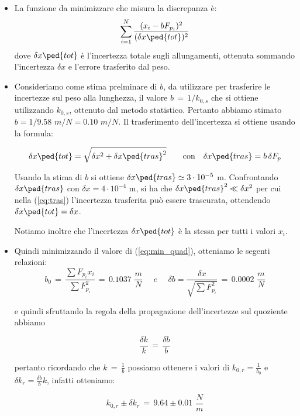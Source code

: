 \begin{itemize}
	\item{La funzione da minimizzare che misura la discrepanza è:
			\begin{equation}
                \sum_{i=1}^{N} \frac{(x_i - bF_{p_i})^2}{(\delta x\ped{tot})^2}	
                \label{eq:min_quad}
			\end{equation}
            dove $\delta x\ped{tot}$ è l'incertezza totale sugli allungamenti, ottenuta sommando l'incertezza $\delta x$ e
            l'errore trasferito dal peso.
        }

    \item{Consideriamo come stima prelminare di $b$, da utilizzare per trasferire le incertezze sul peso alla lunghezza,
        il valore $b \,=\, 1/k_{0,s}$ che si ottiene utilizzando $k_{0,s}$, ottenuto dal metodo
        statistico. Pertanto abbiamo stimato $b = 1/9.58 \,\, m/N = 0.10 \,\, m/N$.
        Il trasferimento dell'incertezza si ottiene usando la formula:
        
        \begin{equation}
            \delta x\ped{tot} = \sqrt{\delta x^2 + \delta x\ped{tras}^2} \qquad \text{con} \quad \delta x\ped{tras} = b\,\delta F_p
            \label{eq:tras}
		\end{equation}

        Usando la stima di $b$ si ottiene $\delta x\ped{tras} \simeq 3 \cdot 10^{-5}$ m. Confrontando $\delta x\ped{tras}$
        con $\delta x = 4 \cdot 10^{-4}$ m, si ha che $\delta x\ped{tras}^2 \ll \delta x^2$ per cui nella (\ref{eq:tras})
        l'incertezza trasferita può essere trascurata, ottendendo $\delta x\ped{tot} = \delta x$.

        Notiamo inoltre che l'incertezza $\delta x\ped{tot}$ è la stessa per tutti i valori $x_i$.}

    \item{Quindi minimizzando il valore di (\ref{eq:min_quad}), otteniamo le segenti relazioni:
			\begin{equation*}
                b_0  \,=\,  \frac{\sum F_{p_i}  x_i}{\sum F_{p_i}^2} \,=\, 0.1037 \,\, \frac{m}{N} \quad \,\, e \quad\,\,
                \delta b  =  \frac{\delta x}{\sqrt{\sum F_{p_i}^2}} \,=\, 0.0002 \,\, \frac{m}{N}
			\end{equation*}

			e quindi sfruttando la regola della propagazione dell'incertezze sul quoziente abbiamo

			\begin{equation*}
				\frac{\delta k}{k} \,=\, \frac{\delta b}{b}
			\end{equation*}

			pertanto ricordando che $k \,=\, \frac{1}{b}$ possiamo ottenere i valori di
            $k_{0,r} = \frac{1}{b_0}$ e $\delta k_{r} = \frac{\delta b}{b} k$, infatti otteniamo:

			\begin{equation*}
                k_{0,r} \pm \delta k_r \,=\, 9.64 \pm 0.01 \,\,\frac{N}{m}
			\end{equation*}
			}
\end{itemize}

